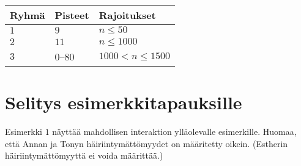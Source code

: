 \medskip
\begin{tabular}{lll}
Ryhmä & Pisteet & Rajoitukset\\\hline
$1$  &  $9$ & $n\leq 50$\\
$2$  &  $11$ & $n\leq 1000$\\
$3$  &  $0$--$80$ & $1000 < n\leq 1500$\\
\end{tabular}

\section*{Selitys esimerkkitapauksille}

Esimerkki $1$ näyttää mahdollisen interaktion ylläolevalle esimerkille.
Huomaa, että Annan ja Tonyn häi\-riin\-ty\-mät\-tö\-myy\-det on määritetty oikein. 
(Estherin häiriintymättömyyttä ei voida määrittää.)
